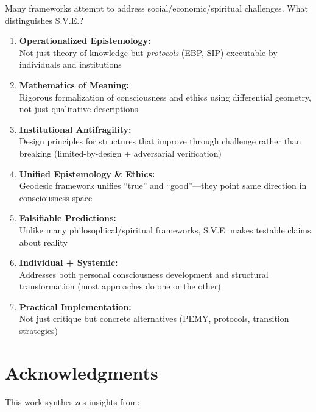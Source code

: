 \documentclass[11pt,a4paper]{article}
\theoremstyle{definition}
\theoremstyle{remark}
\begin{document}
Many frameworks attempt to address social/economic/spiritual challenges. What distinguishes S.V.E.?

\begin{enumerate}
    \item \textbf{Operationalized Epistemology:}
    \\
    Not just theory of knowledge but \textit{protocols} (EBP, SIP) executable by individuals and institutions
    
    \item \textbf{Mathematics of Meaning:}
    \\
    Rigorous formalization of consciousness and ethics using differential geometry, not just qualitative descriptions
    
    \item \textbf{Institutional Antifragility:}
    \\
    Design principles for structures that improve through challenge rather than breaking (limited-by-design + adversarial verification)
    
    \item \textbf{Unified Epistemology \& Ethics:}
    \\
    Geodesic framework unifies ``true'' and ``good''---they point same direction in consciousness space
    
    \item \textbf{Falsifiable Predictions:}
    \\
    Unlike many philosophical/spiritual frameworks, S.V.E. makes testable claims about reality
    
    \item \textbf{Individual + Systemic:}
    \\
    Addresses both personal consciousness development and structural transformation (most approaches do one or the other)
    
    \item \textbf{Practical Implementation:}
    \\
    Not just critique but concrete alternatives (PEMY, protocols, transition strategies)
\end{enumerate}

\section{Acknowledgments}

This work synthesizes insights from:
\end{document}
